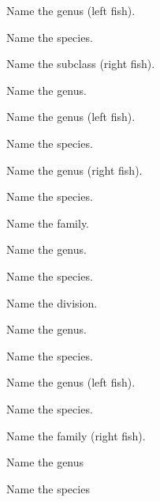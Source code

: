 \documentclass{exam}
\begin{document}
\begin{questions}
{\question Name the genus (left fish).
\vspace{0.5\baselineskip}

\question Name the species.
\vspace{2\baselineskip}

\question Name the subclass (right fish).
\vspace{0.5\baselineskip}

\question Name the genus.
\vspace{2\baselineskip}
%

\question Name the genus (left fish).
\vspace{0.5\baselineskip}

\question Name the species.
\vspace{2\baselineskip}
%


\question Name the genus (right fish).
\vspace{0.5\baselineskip}

\question Name the species.
\vspace{2\baselineskip}
%

\question Name the family.
\vspace{0.5\baselineskip}

\question Name the genus.
\vspace{0.5\baselineskip}

\question Name the species.
\vspace{2\baselineskip}
%


\question Name the division.
\vspace{0.5\baselineskip}

\question Name the genus.
\vspace{0.5\baselineskip}

\question Name the species.
\vspace{2\baselineskip}
%


\question Name the genus (left fish).
\vspace{0.5\baselineskip}

\question Name the species.
\vspace{2\baselineskip}
%

\question Name the family (right fish).
\vspace{0.5\baselineskip}

\question Name the genus
\vspace{0.5\baselineskip}

\question Name the species
\vspace{2\baselineskip}
%

}
\end{questions}
\end{document}
